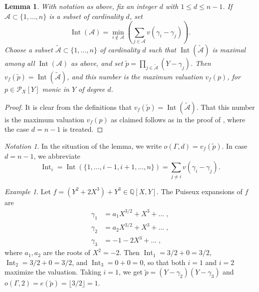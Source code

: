 \documentclass[a4paper,11pt]{amsart}%
\theoremstyle{definition}
\theoremstyle{plain}
\newtheorem{lemma}[defn]{Lemma}
\theoremstyle{remark}
\newtheorem{example}[defn]{Example}
\newtheorem{notation}[defn]{Notation}
\DeclareMathOperator{\Int}{Int}
\begin{document}
\begin{lemma}
\label{lemma:intA} With notation as above, fix an integer $d$ with $1\leq d
\leq n-1$. If $\mathcal{A}\subset\{1,\dots,n\}$ is a subset of cardinality
$d$, set
\[
\Int({\mathcal{A}})=\min_{i\not \in \mathcal{A}}\left(  \sum_{j\in\mathcal{A}%
}v(\gamma_{i}-\gamma_{j})\right)  .
\]
Choose a subset $\widetilde{\mathcal{A}}\subset\{1,\dots,n\}$ of cardinality $d$ such
that $\Int({\widetilde{\mathcal{A}}})$ is maximal among all $\Int({\mathcal{A}})$ 
as above, and set $\widetilde{p}=\prod_{j\in\widetilde{\mathcal{A}}%
}(Y-\gamma_{j})$. Then $v_{f}(\widetilde{p})=\Int({\widetilde{\mathcal{A}}})$,
and this number is the maximum valuation $v_{f}(p)$, for $p\in {\mathcal{P}_{X}}[Y]$ 
monic in $Y$ of degree $d$. %
\end{lemma}

\begin{proof}
It is clear from the definitions that $v_{f}(\widetilde{p})=\Int({\widetilde
{\mathcal{A}}})$. That this number is the maximum valuation $v_{f}(p)$ 
as claimed follows as in the proof of \cite[Theorem 5.1]{vanHoeij94},
where the case $d=n-1$ is treated. 
\end{proof}

\begin{notation} In the situation of the lemma, we write $o(\varGamma,d)
=v_{f}(\tilde{p})$. In case $d = n-1$, we abbreviate
\[
\Int_{i}= \Int(\{1,\dots,i-1,i+1, \dots,n\}) = \sum_{j\neq i}v(\gamma
_{i}-\gamma_{j}).
\]
\end{notation}

\begin{example}
\label{exampleOneBranch} Let $f=(Y^{2}+2X^{3})+Y^{3}\in{\mathbb{Q}}[X,Y]$. The
Puiseux expansions of $f$ are
\begin{align*}
\gamma_{1}  &  =a_{1}X^{3/2}+X^{3}+\dots\;,\\
\gamma_{2}  &  =a_{2}X^{3/2}+X^{3}+\dots\;,\\
\gamma_{3}  &  =-1-2X^{3}+\dots\;,
\end{align*}
where $a_{1}, a_{2}$ are the roots of $X^{2}=-2$. Then $\Int_{1} = 3/2 + 0 =
3/2$, $\Int_{2} = 3/2 + 0 = 3/2$, and $\Int_{3} = 0 + 0 = 0$, so that both $i
= 1$ and $i=2$ maximize the valuation. Taking $i = 1$, we get $\widetilde{p} =
(Y - \gamma_{2})(Y - \gamma_{3})$ and $o(\varGamma,2) = e(\widetilde{p}) 
= \lfloor3/2\rfloor=1$.
\end{example}
\end{document}
